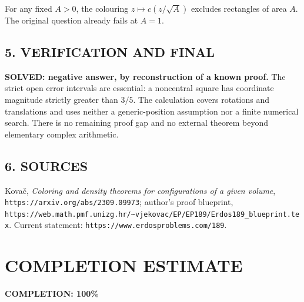 For any fixed $A>0$, the colouring $z\mapsto c(z/\sqrt A)$ excludes rectangles of area $A$. The original question already fails at $A=1$.
\subsection*{5. VERIFICATION AND FINAL}
\textbf{SOLVED: negative answer, by reconstruction of a known proof.}
The strict open error intervals are essential: a noncentral square has coordinate magnitude strictly greater than $3/5$. The calculation covers rotations and translations and uses neither a generic-position assumption nor a finite numerical search. There is no remaining proof gap and no external theorem beyond elementary complex arithmetic.
\subsection*{6. SOURCES}
Kova\v{c}, \emph{Coloring and density theorems for configurations of a given volume}, \texttt{https://arxiv.org/abs/2309.09973}; author's proof blueprint, \texttt{https://web.math.pmf.unizg.hr/\~{}vjekovac/EP/EP189/Erdos189\_blueprint.tex}. Current statement: \texttt{https://www.erdosproblems.com/189}.
\section{COMPLETION ESTIMATE}
\textbf{COMPLETION: 100\%}
